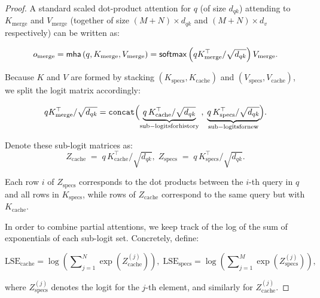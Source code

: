 \begin{proof}
    
A standard scaled dot-product attention for $ q $ (of size $d_{qk}$) attending to $ K_{\mathrm{merge}} $ and $ V_{\mathrm{merge}} $ (together of size $(M+N) \times d_{qk}$ and $(M+N) \times d_v$ respectively) can be written as:

\begin{equation*}
    o_{\mathrm{merge}} = \mathsf{mha}\left(q, K_{\mathrm{merge}}, V_{\mathrm{merge}}\right) =
    \mathsf{softmax}\left(
      qK_{\mathrm{merge}}^\top/\sqrt{d_{qk}}
    \right) V_{\mathrm{merge}}.
\end{equation*}

Because $ K $ and $ V $ are formed by stacking $\left(K_{\mathrm{specs}}, K_{\mathrm{cache}}\right)$ and $\left(V_{\mathrm{specs}}, V_{\mathrm{cache}}\right)$, we split the logit matrix accordingly:

\begin{equation*}
    q K_{\mathrm{merge}}^\top / \sqrt{d_{qk}} = 
    \texttt{concat}\Bigl(
    \underbrace{
      q \, K_{\mathrm{cache}}^\top / \sqrt{d_{qk}}
    }_{\mathrm{sub-logits for history}}
    \;, \;
    \underbrace{
      q \, K_{\mathrm{specs}}^\top / \sqrt{d_{qk}}
    }_{\mathrm{sub-logits for new}}
    \Bigr).
\end{equation*}

Denote these sub-logit matrices as:
\[
Z_{\mathrm{cache}} \;=\; q \, K_{\mathrm{cache}}^\top / \sqrt{d_{qk}}
,\;
Z_{\mathrm{specs}} \;=\; q \, K_{\mathrm{specs}}^\top / \sqrt{d_{qk}}.
\]

Each row $i$ of $Z_{\mathrm{specs}}$ corresponds to the dot products between the $i$-th query in $q$ and all rows in $K_{\mathrm{specs}}$, while rows of $Z_{\mathrm{cache}}$ correspond to the same query but with $K_{\mathrm{cache}}$.

In order to combine partial attentions, we keep track of the log of the sum of exponentials of each sub-logit set. Concretely, define:

\begin{equation}
    \mathrm{LSE}_{\mathrm{cache}} = \log\left(\sum\nolimits_{j=1}^{N} \exp\left(Z_{\mathrm{cache}}^{(j)}\right)\right),
    \;
    \mathrm{LSE}_{\mathrm{specs}} = \log\left(\sum\nolimits_{j=1}^{M} \exp\left(Z_{\mathrm{specs}}^{(j)}\right)\right),
    \,
\end{equation}

where $Z_{\mathrm{specs}}^{(j)}$ denotes the logit for the $j$-th element, and similarly for $Z_{\mathrm{cache}}^{(j)}$.


\end{proof}
